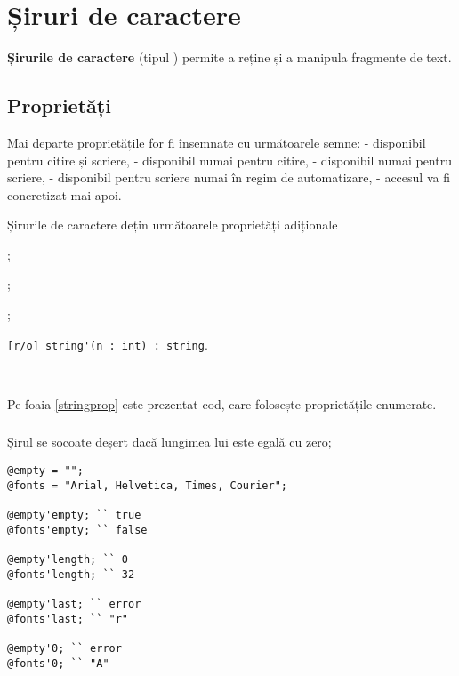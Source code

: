 \section{Șiruri de caractere}

{\bf Șirurile de caractere} (tipul \str{}) permite a reține și a manipula fragmente de text. 

\subsection{Proprietăți}

Mai departe proprietățile for fi însemnate cu următoarele semne: \code{[r/w]} - disponibil pentru citire și scriere, \code{[r/o]} - disponibil numai pentru citire, \code{[w/o]} - disponibil numai pentru scriere,  \code{[r/*]} - disponibil pentru scriere numai în regim de automatizare, \code{[*/*]} - accesul va fi concretizat mai apoi.

Șirurile de caractere dețin următoarele proprietăți adiționale
\begin{icItems}
\item
	;
\item
	;
\item
	;
\item
	\lstinline|[r/o] string'(n : int) : string|.
\end{icItems}

\

Pe foaia \ref{stringprop} este prezentat cod, care folosește proprietățile enumerate.

\subsubsection{}

Șirul se socoate deșert dacă lungimea lui este egală cu zero;

\begin{lstlisting}[caption=Proprietățile clasei string, label=stringprop]
@empty = "";
@fonts = "Arial, Helvetica, Times, Courier";

@empty'empty; `` true
@fonts'empty; `` false

@empty'length; `` 0
@fonts'length; `` 32

@empty'last; `` error
@fonts'last; `` "r"

@empty'0; `` error
@fonts'0; `` "A"
\end{lstlisting}

